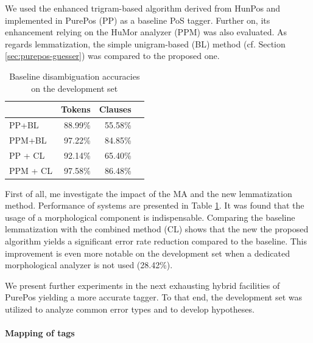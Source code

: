 We used the enhanced trigram-based algorithm derived from HunPos and implemented in PurePos (PP) as a baseline PoS tagger. 
Further on, its enhancement relying on the HuMor analyzer (PPM) was also evaluated. As regards lemmatization, the simple unigram-based (BL) method (cf. Section \ref{sec:purepos-guesser}) was compared to the proposed one. 

\begin{table}[ht]
\centering
\caption{Baseline disambiguation accuracies on the development set}\label{tab:oldhun-baselines}
\begin{tabular}{l r r r}
\hline
 & Tokens & Clauses \\
\hline
PP+BL  & 88.99\% & 55.58\% \\
PPM+BL  & 97.22\% & 84.85\% \\
PP + CL & 92.14\% & 65.40\% \\
PPM + CL & 97.58\% & 86.48\% \\
\hline
\end{tabular}
\end{table}



First of all, me investigate the impact of the MA and the new lemmatization method. 
Performance of systems are presented in Table \ref{tab:oldhun-baselines}. 
It was found that the usage of a morphological component is indispensable. 
Comparing the baseline lemmatization with the combined method (CL) shows that the new the proposed algorithm yields a significant error rate reduction compared to the baseline. 
This improvement is even more notable on the development set when a dedicated morphological analyzer is not used (28.42\%).

We present further experiments in the next exhausting hybrid facilities of PurePos yielding a more accurate tagger. To that end, the development set was utilized to analyze common error types and to develop hypotheses.


\paragraph{Mapping of tags}

